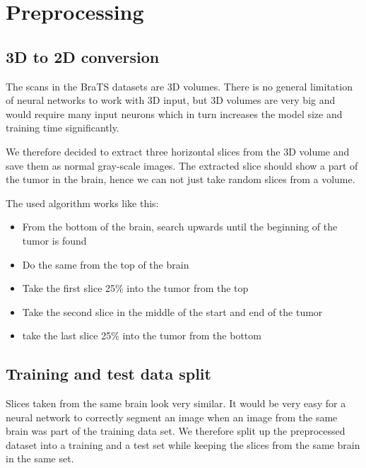\section{Preprocessing}
\subsection{3D to 2D conversion}
The scans in the BraTS datasets are 3D volumes. There is no general limitation of neural networks to work with 3D input, but 3D volumes are very big and would require many input neurons which in turn increases the model size and training time significantly.

We therefore decided to extract three horizontal slices from the 3D volume and save them as normal gray-scale images.
The extracted slice should show a part of the tumor in the brain, hence we can not just take random slices from a volume.

The used algorithm works like this:

\begin{itemize}
    \item From the bottom of the brain, search upwards until the beginning of the tumor is found
    \item Do the same from the top of the brain
    \item Take the first slice 25\% into the tumor from the top
    \item Take the second slice in the middle of the start and end of the tumor
    \item take the last slice 25\% into the tumor from the bottom
\end{itemize}

\subsection{Training and test data split}

Slices taken from the same brain look very similar. It would be very easy for a neural network to correctly segment an image when an image from the same brain was part of the training data set.
We therefore split up the preprocessed dataset into a training and a test set while keeping the slices from the same brain in the same set.

